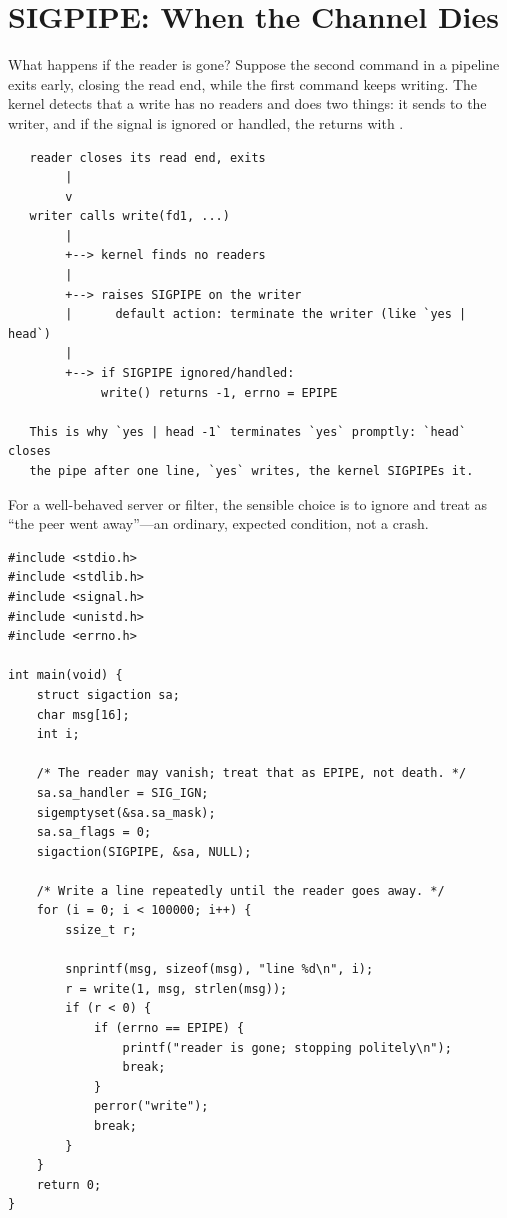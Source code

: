 \section{SIGPIPE: When the Channel Dies}

What happens if the reader is gone? Suppose the second command in a
pipeline exits early, closing the read end, while the first command
keeps writing. The kernel detects that a write has no readers and does
two things: it sends  to the writer, and if the signal
is ignored or handled, the  returns  with
.

\begin{verbatim}
   reader closes its read end, exits
        |
        v
   writer calls write(fd1, ...)
        |
        +--> kernel finds no readers
        |
        +--> raises SIGPIPE on the writer
        |      default action: terminate the writer (like `yes | head`)
        |
        +--> if SIGPIPE ignored/handled:
             write() returns -1, errno = EPIPE

   This is why `yes | head -1` terminates `yes` promptly: `head` closes
   the pipe after one line, `yes` writes, the kernel SIGPIPEs it.
\end{verbatim}

For a well-behaved server or filter, the sensible choice is to ignore
 and treat  as ``the peer went away''---an
ordinary, expected condition, not a crash.

\begin{lstlisting}[caption={Handling a dead reader gracefully.}]
#include <stdio.h>
#include <stdlib.h>
#include <signal.h>
#include <unistd.h>
#include <errno.h>

int main(void) {
    struct sigaction sa;
    char msg[16];
    int i;

    /* The reader may vanish; treat that as EPIPE, not death. */
    sa.sa_handler = SIG_IGN;
    sigemptyset(&sa.sa_mask);
    sa.sa_flags = 0;
    sigaction(SIGPIPE, &sa, NULL);

    /* Write a line repeatedly until the reader goes away. */
    for (i = 0; i < 100000; i++) {
        ssize_t r;

        snprintf(msg, sizeof(msg), "line %d\n", i);
        r = write(1, msg, strlen(msg));
        if (r < 0) {
            if (errno == EPIPE) {
                printf("reader is gone; stopping politely\n");
                break;
            }
            perror("write");
            break;
        }
    }
    return 0;
}
\end{lstlisting}

